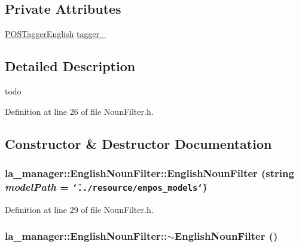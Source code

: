 \subsection*{Private Attributes}
\begin{CompactItemize}
\item 
\hyperlink{classla__manager_1_1POSTaggerEnglish}{POSTaggerEnglish} \hyperlink{classla__manager_1_1EnglishNounFilter_d612ad131bb8a08e35fc92ff0c01930b}{tagger\_\-}
\end{CompactItemize}


\subsection{Detailed Description}
todo 

Definition at line 26 of file NounFilter.h.

\subsection{Constructor \& Destructor Documentation}
\hypertarget{classla__manager_1_1EnglishNounFilter_1ad97483125324eb139981b1c02bbb20}{
\subsubsection[{EnglishNounFilter}]{\setlength{\rightskip}{0pt plus 5cm}la\_\-manager::EnglishNounFilter::EnglishNounFilter (string {\em modelPath} = {\tt \char`\"{}../resource/enpos\_\-models\char`\"{}})}}
\label{classla__manager_1_1EnglishNounFilter_1ad97483125324eb139981b1c02bbb20}




Definition at line 29 of file NounFilter.h.\hypertarget{classla__manager_1_1EnglishNounFilter_11cbedc0463e0616bdcb1e7168a5d2bd}{
\subsubsection[{$\sim$EnglishNounFilter}]{\setlength{\rightskip}{0pt plus 5cm}la\_\-manager::EnglishNounFilter::$\sim$EnglishNounFilter ()}}
\label{classla__manager_1_1EnglishNounFilter_11cbedc0463e0616bdcb1e7168a5d2bd}




